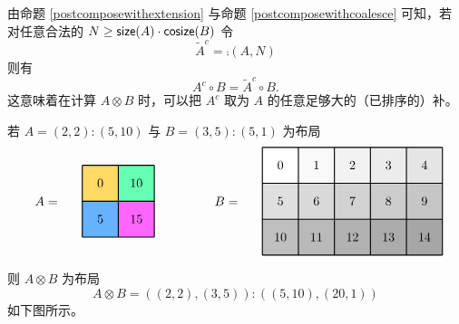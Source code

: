 \begin{observation}
    由命题 \ref{postcomposewithextension} 与命题 \ref{postcomposewithcoalesce} 可知，若对任意合法的 $N \geq \mathsf{size}(A) \cdot \mathsf{cosize}(B)$ 令
    \[
    \widetilde{A}^c = \comp(A,N)
    \]
    则有
    \[
    A^c \circ B = \tilde{A}^c \circ B.
    \]
    这意味着在计算 $A \otimes B$ 时，可以把 $A^c$ 取为 $A$ 的任意足够大的（已排序的）补。
\end{observation}

\begin{example}
    若 $A = (2,2):(5,10)$ 与 $B = (3,5):(5,1)$ 为布局
    \[
    \begin{tikzpicture}[x={(0cm,-1cm)},y={(1cm,0cm)},every node/.style={minimum size=1cm, outer sep=0pt}]

\node[fill=colorx2!60] at (0.5,0) {0};
\node[fill=colorx4!60] at (0.5,1) {10};
\node[fill=colorx6!60] at (1.5,0) {5};
\node[fill=colorx8!60] at (1.5,1) {15};
\draw[color=black,thick,shift={(0,-0.5)}] (0,0) grid (2,2);

\node[fill=gray!0] at (0,5) {0};
\node[fill=gray!5] at (0,6) {1};
\node[fill=gray!10] at (0,7) {2};
\node[fill=gray!15] at (0,8) {3};
\node[fill=gray!20] at (0,9) {4};
\node[fill=gray!25] at (1,5) {5};
\node[fill=gray!30] at (1,6) {6};
\node[fill=gray!35] at (1,7) {7};
\node[fill=gray!40] at (1,8) {8};
\node[fill=gray!45] at (1,9) {9};
\node[fill=gray!50] at (2,5) {10};
\node[fill=gray!55] at (2,6) {11};
\node[fill=gray!60] at (2,7) {12};
\node[fill=gray!65] at (2,8) {13};
\node[fill=gray!70] at (2,9) {14};
\draw[color=black,thick,shift={(-0.5,-0.5)}] (0,5) grid (3,10);

\node[anchor = east] at (1,-1) {$A = $ };
\node[anchor = east] at (1,4) {$B = $ };

\end{tikzpicture}
    \]
    则 $A \otimes B$ 为布局
    \[
    A \otimes B = ((2,2),(3,5)):((5,10),(20,1))
    \]
如下图所示。
    

\end{example}
